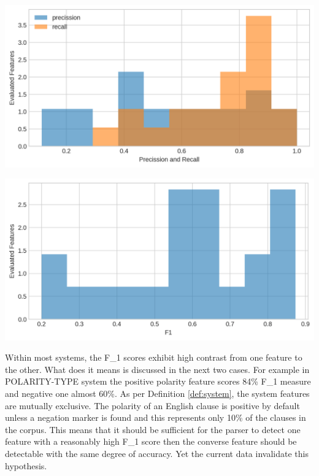    \begin{minipage}[t]{0.45\textwidth}
        \centering
        \includegraphics[width=\textwidth]{evaluation-results/figures/accuracy-syntactic-mood-precission-recall.png}
        \label{fig:mood-precission-recall}
    \end{minipage}
    \begin{minipage}[t]{0.45\textwidth}
        \centering
        \includegraphics[width=\textwidth]{evaluation-results/figures/accuracy-syntactic-mood-f1.png}
        \label{fig:mood-precission-f1}
    \end{minipage}

Within most systems, the F_1 scores exhibit high contrast from one feature to the other. What does it means is discussed in the next two cases. For example in POLARITY-TYPE system the positive polarity feature scores 84\% F_1 measure and negative one almost 60\%. As per Definition \ref{def:system}, the system features are mutually exclusive. The polarity of an English clause is positive by default unless a negation marker is found and this represents only 10\% of the clauses in  the corpus. This means that it should be sufficient for the parser to detect one feature with a reasonably high F_1 score then the converse feature should be detectable with the same degree of accuracy. Yet the current data invalidate this hypothesis. 


